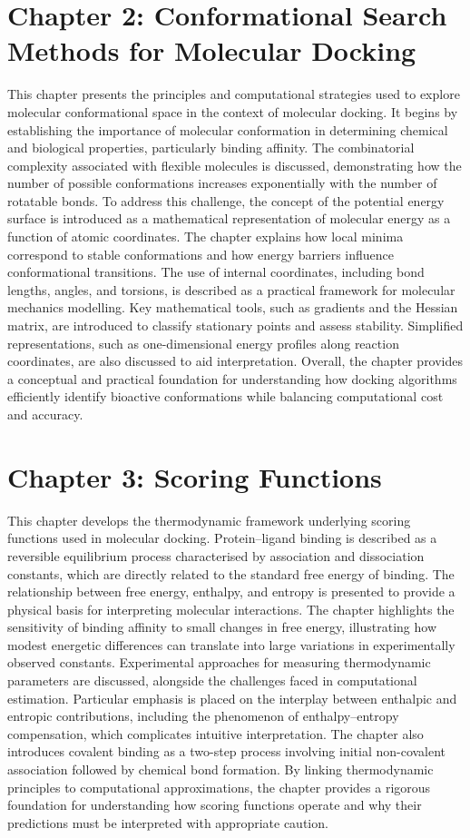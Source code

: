 \documentclass[12pt,a4paper]{article}
\begin{document}
\section*{Chapter 2: Conformational Search Methods for Molecular Docking}
This chapter presents the principles and computational strategies used to explore molecular conformational space in the context of molecular docking. It begins by establishing the importance of molecular conformation in determining chemical and biological properties, particularly binding affinity. The combinatorial complexity associated with flexible molecules is discussed, demonstrating how the number of possible conformations increases exponentially with the number of rotatable bonds. To address this challenge, the concept of the potential energy surface is introduced as a mathematical representation of molecular energy as a function of atomic coordinates. The chapter explains how local minima correspond to stable conformations and how energy barriers influence conformational transitions. The use of internal coordinates, including bond lengths, angles, and torsions, is described as a practical framework for molecular mechanics modelling. Key mathematical tools, such as gradients and the Hessian matrix, are introduced to classify stationary points and assess stability. Simplified representations, such as one-dimensional energy profiles along reaction coordinates, are also discussed to aid interpretation. Overall, the chapter provides a conceptual and practical foundation for understanding how docking algorithms efficiently identify bioactive conformations while balancing computational cost and accuracy.

\section*{Chapter 3: Scoring Functions}
This chapter develops the thermodynamic framework underlying scoring functions used in molecular docking. Protein–ligand binding is described as a reversible equilibrium process characterised by association and dissociation constants, which are directly related to the standard free energy of binding. The relationship between free energy, enthalpy, and entropy is presented to provide a physical basis for interpreting molecular interactions. The chapter highlights the sensitivity of binding affinity to small changes in free energy, illustrating how modest energetic differences can translate into large variations in experimentally observed constants. Experimental approaches for measuring thermodynamic parameters are discussed, alongside the challenges faced in computational estimation. Particular emphasis is placed on the interplay between enthalpic and entropic contributions, including the phenomenon of enthalpy–entropy compensation, which complicates intuitive interpretation. The chapter also introduces covalent binding as a two-step process involving initial non-covalent association followed by chemical bond formation. By linking thermodynamic principles to computational approximations, the chapter provides a rigorous foundation for understanding how scoring functions operate and why their predictions must be interpreted with appropriate caution.
\end{document}
